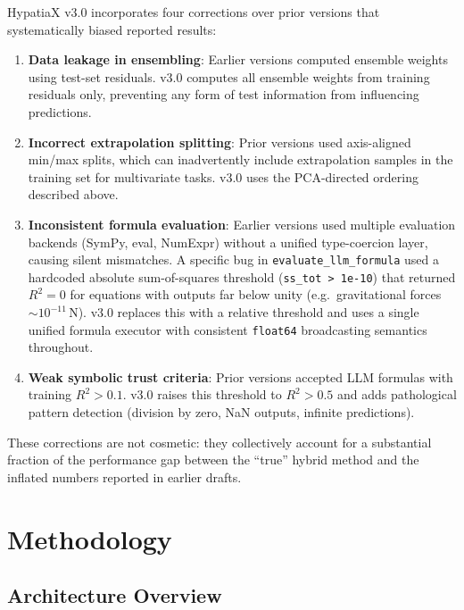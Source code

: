 \documentclass[twoside,11pt]{article}
\newcommand{\Rsq}{R^{2}}
\begin{document}
HypatiaX v3.0 incorporates four corrections over prior versions that systematically
biased reported results:

\begin{enumerate}[leftmargin=2em,label=\arabic*.]
  \item \textbf{Data leakage in ensembling}: Earlier versions computed ensemble
    weights using test-set residuals.  v3.0 computes all ensemble weights from
    training residuals only, preventing any form of test information from
    influencing predictions.

  \item \textbf{Incorrect extrapolation splitting}: Prior versions used axis-aligned
    min/max splits, which can inadvertently include extrapolation samples in the
    training set for multivariate tasks.  v3.0 uses the PCA-directed ordering
    described above.

  \item \textbf{Inconsistent formula evaluation}: Earlier
    versions used multiple evaluation backends (SymPy, eval, NumExpr) without a
    unified type-coercion layer, causing silent mismatches.  A specific bug in
    \texttt{evaluate\_llm\_formula} used a hardcoded absolute sum-of-squares
    threshold (\texttt{ss\_tot > 1e-10}) that returned $\Rsq = 0$ for equations
    with outputs far below unity (e.g.\ gravitational forces $\sim 10^{-11}$\,N).
    v3.0 replaces this with a relative threshold and uses a single unified formula
    executor with consistent \texttt{float64} broadcasting semantics throughout.

  \item \textbf{Weak symbolic trust criteria}: Prior versions accepted LLM formulas
    with training $\Rsq > 0.1$.  v3.0 raises this threshold to $\Rsq > 0.5$ and
    adds pathological pattern detection (division by zero, NaN outputs, infinite
    predictions).
\end{enumerate}

These corrections are not cosmetic: they collectively account for a substantial
fraction of the performance gap between the ``true'' hybrid method and the inflated
numbers reported in earlier drafts.

\section{Methodology}
\label{sec:method}

\subsection{Architecture Overview}\label{subsec:architecture-overview}
\label{sec:method_overview}
\end{document}

